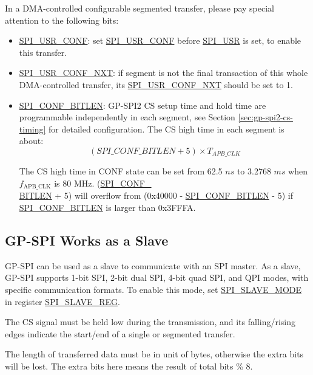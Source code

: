 \documentclass[main\_\_EN.tex]{subfiles}
\begin{document}
In a DMA-controlled configurable segmented transfer, please pay special attention to the following bits:
\begin{itemize}
    \item \hyperref[fielddesc:SPIUSRCONF]{SPI\_USR\_CONF}: set \hyperref[fielddesc:SPIUSRCONF]{SPI\_USR\_CONF} before \hyperref[fielddesc:SPIUSR]{SPI\_USR} is set, to enable this transfer.
    \item \hyperref[fielddesc:SPIUSRCONFNXT]{SPI\_USR\_CONF\_NXT}: if segment is not the final transaction of this whole DMA-controlled transfer, its \hyperref[fielddesc:SPIUSRCONFNXT]{SPI\_USR\_CONF\_NXT} should be set to 1.
    \item \hyperref[fielddesc:SPICONFBITLEN]{SPI\_CONF\_BITLEN}: GP-SPI2 CS setup time and hold time are programmable independently in each segment, see Section \ref{sec:gp-spi2-cs-timing} for detailed configuration. The CS high time in each segment is about:
    \[
    (\hyperref[fielddesc:SPICONFBITLEN]{SPI\_CONF\_BITLEN} + 5) \times T_{APB\_CLK}
    \]

The CS high time in CONF state can be set from 62.5 $ns$ to 3.2768 $ms$ when $f_{\textrm{APB\_CLK}}$ is 80 MHz.
(\hyperref[fielddesc:SPICONFBITLEN]{SPI\_CONF\_\\BITLEN} + 5) will overflow from (0x{}40000 - \hyperref[fielddesc:SPICONFBITLEN]{SPI\_CONF\_BITLEN} - 5) if \hyperref[fielddesc:SPICONFBITLEN]{SPI\_CONF\_BITLEN} is larger than 0x{}3FFFA.
\end{itemize}

\subsection{GP-SPI Works as a Slave}\label{sec:gp-spi2-slave-mode}

GP-SPI can be used as a slave to communicate with an SPI master. As a slave, GP-SPI supports 1-bit SPI, 2-bit dual SPI, 4-bit quad SPI, and QPI modes, with specific communication formats. To enable this mode, set \hyperref[fielddesc:SPISLAVEMODE]{SPI\_SLAVE\_MODE} in register \hyperref[regdesc:SPISLAVEREG]{SPI\_SLAVE\_REG}.

The CS signal must be held low during the transmission, and its falling/rising edges indicate the start/end of a single or segmented transfer.
\begin{tiplisting}
The length of transferred data must be in unit of bytes, otherwise the extra bits will be lost. The extra bits here means the result of total bits \% 8.
\end{tiplisting}
\end{document}

